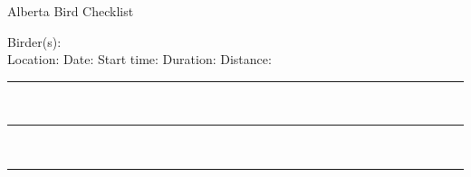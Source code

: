 \documentclass{article}
\newcommand{\newnoteline}{\rule{\textwidth}{0.15mm}\\[1.5ex]}
\begin{document}
\centering
\LARGE{Alberta Bird Checklist}\\
\normalsize \raggedright


Birder(s): \underline{\hspace{112ex}}\\[1.5ex]
Location: \underline{\hspace{28ex}}    Date: \underline{\hspace{13ex}}    Start time: \underline{\hspace{10ex}}   Duration: \underline{\hspace{10ex}}    Distance: \underline{\hspace{10ex}}\\[1.5ex]


\newnoteline\newnoteline\newnoteline


\begin{center}


\end{center}
\end{document}
